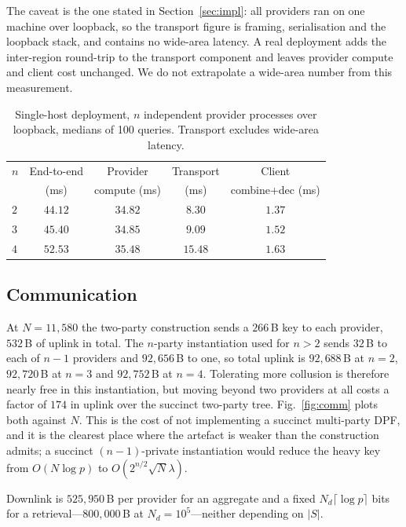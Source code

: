 \documentclass[journal]{IEEEtran}
\begin{document}
The caveat is the one stated in Section~\ref{sec:impl}: all providers ran on one
machine over loopback, so the transport figure is framing, serialisation and the
loopback stack, and contains no wide-area latency. A real deployment adds the
inter-region round-trip to the transport component and leaves provider compute
and client cost unchanged. We do not extrapolate a wide-area number from this
measurement.

\begin{table}[t]
\centering
\caption{Single-host deployment, $n$ independent provider processes over
loopback, medians of 100 queries. Transport excludes wide-area latency.}
\label{tab:wan}
\footnotesize
\renewcommand{\arraystretch}{1.2}
\begin{tabular*}{\columnwidth}{@{\extracolsep{\fill}}lcccc@{}}
\toprule
$n$ & End-to-end & Provider & Transport & Client \\
    & (ms)       & compute (ms) & (ms)  & combine+dec (ms) \\
\midrule
$2$ & $44.12$ & $34.82$ & $8.30$  & $1.37$ \\
$3$ & $45.40$ & $34.85$ & $9.09$  & $1.52$ \\
$4$ & $52.53$ & $35.48$ & $15.48$ & $1.63$ \\
\bottomrule
\end{tabular*}
\end{table}

\subsection{Communication}
\label{sec:commresult}
At $N=11{,}580$ the two-party construction sends a $266$\,B key to each
provider, $532$\,B of uplink in total. The $n$-party instantiation used for
$n>2$ sends $32$\,B to each of $n-1$ providers and $92{,}656$\,B to one, so
total uplink is $92{,}688$\,B at $n=2$, $92{,}720$\,B at $n=3$ and
$92{,}752$\,B at $n=4$. Tolerating more collusion is therefore nearly free in
this instantiation, but moving beyond two providers at all costs a factor of
$174$ in uplink over the succinct two-party tree. Fig.~\ref{fig:comm} plots both
against $N$. This is the cost of not implementing a succinct multi-party DPF,
and it is the clearest place where the artefact is weaker than the construction
admits; a succinct $(n{-}1)$-private instantiation would reduce the heavy key
from $O(N\log p)$ to $O(2^{n/2}\sqrt{N}\lambda)$.

Downlink is $525{,}950$\,B per provider for an aggregate and a fixed
$N_d\lceil\log p\rceil$ bits for a retrieval---$800{,}000$\,B at
$N_d=10^5$---neither depending on $|S|$.
\end{document}
